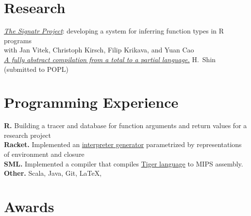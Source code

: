 \documentclass[margin,line]{resume}
\begin{document}
\begin{resume}
    \section{\mysidestyle Research}
    \textit{\href{https://github.com/PRL-PRG/signatr}{The Signatr Project}}:
    developing a system for inferring function types in R programs\\
          {\small with Jan Vitek, Christoph Kirsch, Filip Krikava, and Yuan Cao}\\[\mymedskip]
    \textit{\href{https://github.com/hyeyoungshin/popl19src/blob/master/popl19src.pdf}{A fully abstract compilation from
        a total to a partial language.}} H.~Shin (submitted to {\small POPL})\\ %

    \section{\mysidestyle Programming Experience} 

    \textbf{R.} Building a tracer and database for function arguments and return values for a research project\\[\mymedskip]
    \textbf{Racket.} Implemented an \href{https://github.com/hyeyoungshin/hy_eopl}{interpreter generator} parametrized by representations of environment and closure\\[\mymedskip]
    \textbf{SML.} Implemented a compiler that compiles
    \href{https://www.cs.princeton.edu/~appel/modern/ml/}{Tiger language} to
    {\small MIPS} assembly.\\[\mymedskip]
    \textbf{Other.} Scala, Java, Git, \LaTeX, 

    \section{\mysidestyle Awards} 


\end{resume}
\end{document}
